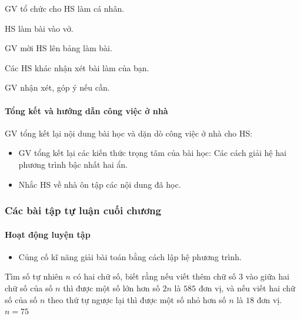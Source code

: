 \begin{tcth}[baitap={1.23 và 1.24}]
	\buocmot
	\item GV tổ chức cho HS làm cá nhân.
	\buochai
	\item HS làm bài vào vở.
	\item GV mời HS lên bảng làm bài.
	\buocba
	\item Các HS khác nhận xét bài làm của bạn.
	\buocbon
	\item GV nhận xét, góp ý nếu cần.
\end{tcth}

\paragraph{Tổng kết và hướng dẫn công việc ở nhà}

GV tổng kết lại nội dung bài học và dặn dò công việc ở nhà cho HS:

\begin{itemize}
	\item GV tổng kết lại các kiến thức trọng tâm của bài học: Các cách giải hệ hai phương trình bậc nhất hai ẩn.
	\item Nhắc HS về nhà ôn tập các nội dung đã học.
\end{itemize}

\subsubsection{Các bài tập tự luận cuối chương}

\paragraph{Hoạt động luyện tập}

\muctieu

\begin{itemize}
	\item Củng cố kĩ năng giải bài toán bằng cách lập hệ phương trình.
\end{itemize}

\noidungsanpham

\begin{baitap}[1.25]
	Tìm số tự nhiên $n$ có hai chữ số, biết rằng nếu viết thêm chữ số 3 vào giữa hai chữ số của số $n$ thì được một số lớn hơn số $2n$ là $585$ đơn vị, và nếu viết hai chữ số của số $n$ theo thứ tự ngược lại thì được một số nhỏ hơn số $n$ là $18$ đơn vị.
	\doicot
	\huongdan\\
	$n = 75$
\end{baitap}

